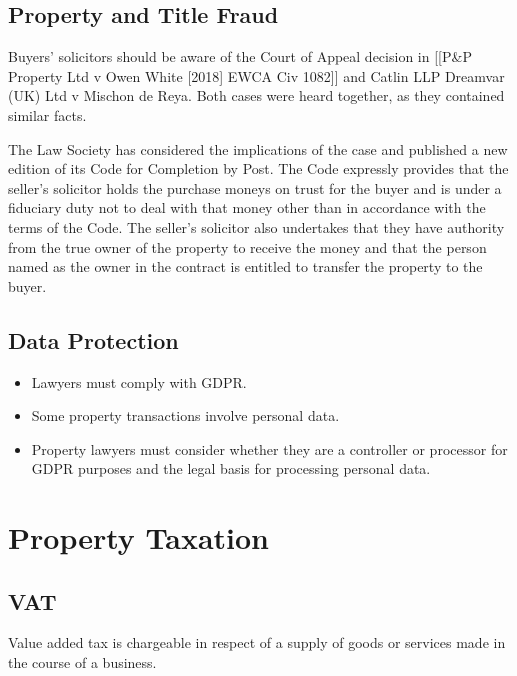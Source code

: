 \documentclass[
]{article}
\providecommand{\tightlist}{%
  \setlength{\itemsep}{0pt}\setlength{\parskip}{0pt}}
\begin{document}
\hypertarget{property-and-title-fraud}{%
\subsection{Property and Title Fraud}\label{property-and-title-fraud}}

Buyers' solicitors should be aware of the Court of Appeal decision in
{[}{[}P\&P Property Ltd v Owen White {[}2018{]} EWCA Civ 1082{]}{]} and
Catlin LLP Dreamvar (UK) Ltd v Mischon de Reya. Both cases were heard
together, as they contained similar facts.

The Law Society has considered the implications of the case and
published a new edition of its Code for Completion by Post. The Code
expressly provides that the seller's solicitor holds the purchase moneys
on trust for the buyer and is under a fiduciary duty not to deal with
that money other than in accordance with the terms of the Code. The
seller's solicitor also undertakes that they have authority from the
true owner of the property to receive the money and that the person
named as the owner in the contract is entitled to transfer the property
to the buyer.

\hypertarget{data-protection}{%
\subsection{Data Protection}\label{data-protection}}

\begin{itemize}
\tightlist
\item
  Lawyers must comply with GDPR.
\item
  Some property transactions involve personal data.
\item
  Property lawyers must consider whether they are a controller or
  processor for GDPR purposes and the legal basis for processing
  personal data.
\end{itemize}

\hypertarget{property-taxation}{%
\section{Property Taxation}\label{property-taxation}}

\hypertarget{vat}{%
\subsection{VAT}\label{vat}}

Value added tax is chargeable in respect of a supply of goods or
services made in the course of a business.
\end{document}
